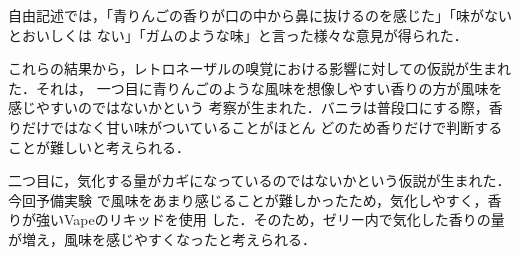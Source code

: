 自由記述では，「青りんごの香りが口の中から鼻に抜けるのを感じた」「味がないとおいしくは
ない」「ガムのような味」と言った様々な意見が得られた．


これらの結果から，レトロネーザルの嗅覚における影響に対しての仮説が生まれた．それは，
一つ目に青りんごのような風味を想像しやすい香りの方が風味を感じやすいのではないかという
考察が生まれた．バニラは普段口にする際，香りだけではなく甘い味がついていることがほとん
どのため香りだけで判断することが難しいと考えられる．


二つ目に，気化する量がカギになっているのではないかという仮説が生まれた．今回予備実験
で風味をあまり感じることが難しかったため，気化しやすく，香りが強いVapeのリキッドを使用
した．そのため，ゼリー内で気化した香りの量が増え，風味を感じやすくなったと考えられる．